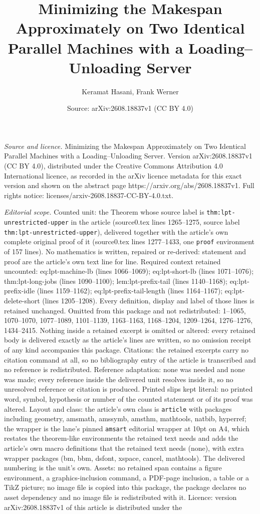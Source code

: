 \documentclass[10pt,a4paper]{amsart}
\title[Minimizing the Makespan Approximately on Two Identical Paral]{Minimizing the Makespan Approximately on Two Identical Parallel Machines with a Loading--Unloading Server}
\author{Keramat Hasani, Frank Werner}
\date{Source: arXiv:2608.18837v1 (CC BY 4.0)}
\begin{document}
\maketitle

\noindent\emph{Source and licence.} Minimizing the Makespan Approximately on Two Identical Parallel Machines with a Loading--Unloading Server. Version arXiv:2608.18837v1 (CC BY 4.0), distributed under the Creative Commons Attribution 4.0 International licence, as recorded in the arXiv licence metadata for this exact version and shown on the abstract page https://arxiv.org/abs/2608.18837v1. Full rights notice: licenses/arxiv-2608.18837-CC-BY-4.0.txt.\par\smallskip

\noindent\textit{Editorial scope.} Counted unit: the Theorem whose source label is \texttt{thm:lpt-unrestricted-upper} in the article (source0.tex lines 1265--1275, source label \texttt{thm:lpt-unrestricted-upper}), delivered together with the article's own complete original proof of it (source0.tex lines 1277--1433, one \texttt{proof} environment of 157 lines). No mathematics is written, repaired or re-derived: statement and proof are the article's own text line for line. Required context retained uncounted: eq:lpt-machine-lb (lines 1066--1069); eq:lpt-short-lb (lines 1071--1076); thm:lpt-long-jobs (lines 1090--1100); lem:lpt-prefix-tail (lines 1140--1168); eq:lpt-prefix-idle (lines 1159--1162); eq:lpt-prefix-tail-length (lines 1164--1167); eq:lpt-delete-short (lines 1205--1208). Every definition, display and label of those lines is retained unchanged. Omitted from this package and not redistributed: 1--1065, 1070--1070, 1077--1089, 1101--1139, 1163--1163, 1168--1204, 1209--1264, 1276--1276, 1434--2415. Nothing inside a retained excerpt is omitted or altered: every retained body is delivered exactly as the article's lines are written, so no omission receipt of any kind accompanies this package. Citations: the retained excerpts carry no citation command at all, so no bibliography entry of the article is transcribed and no reference is redistributed. Reference adaptation: none was needed and none was made; every reference inside the delivered unit resolves inside it, so no unresolved reference or citation is produced. Printed slips kept literal: no printed word, symbol, hypothesis or number of the counted statement or of its proof was altered. Layout and class: the article's own class is \texttt{article} with packages including geometry, amsmath, amssymb, amsthm, mathtools, natbib, hyperref; the wrapper is the lane's pinned \texttt{amsart} editorial wrapper at 10pt on A4, which restates the theorem-like environments the retained text needs and adds the article's own macro definitions that the retained text needs (none), with extra wrapper packages (bm, bbm, dsfont, xspace, cancel, mathtools). The delivered numbering is the unit's own. Assets: no retained span contains a figure environment, a graphics-inclusion command, a PDF-page inclusion, a table or a TikZ picture; no image file is copied into this package, the package declares no asset dependency and no image file is redistributed with it. Licence: version arXiv:2608.18837v1 of this article is distributed under the 
\end{document}

